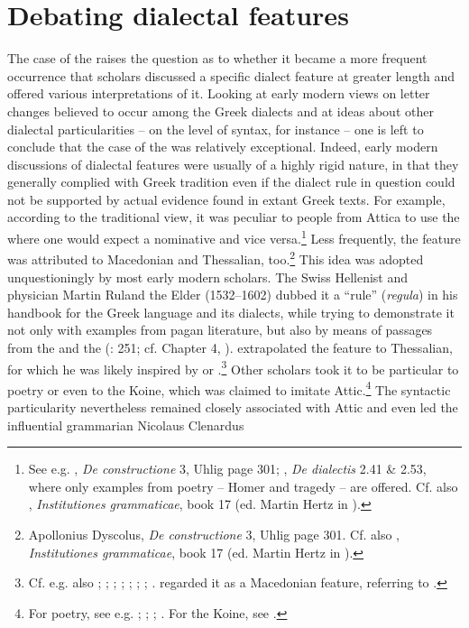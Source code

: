 \section{Debating dialectal features}\label{sec:6.4}

The case of the  raises the question as to whether it became a more frequent occurrence that scholars discussed a specific dialect feature at greater length and offered various interpretations of it. Looking at early modern views on letter changes believed to occur among the Greek dialects and at ideas about other dialectal particularities – on the level of syntax, for instance – one is left to conclude that the case of the  was relatively exceptional. Indeed, early modern discussions of dialectal features were usually of a highly rigid nature, in that they generally complied with Greek tradition even if the dialect rule in question could not be supported by actual evidence found in extant Greek texts. For example, according to the traditional view, it was peculiar to people from Attica to use the  where one would expect a nominative and vice versa.\footnote{See e.g. , \textit{De constructione} 3, Uhlig page 301; , \textit{De dialectis} 2.41 \& 2.53, where only examples from poetry – Homer and tragedy – are offered. Cf. also , \textit{Institutiones grammaticae}, book 17 (ed. Martin Hertz in \citealt[208]{Keil1859}).} Less frequently, the feature was attributed to Macedonian and Thessalian, too.\footnote{Apollonius Dyscolus, \textit{De constructione} 3, Uhlig page 301. Cf. also , \textit{Institutiones grammaticae}, book 17 (ed. Martin Hertz in \citealt[208]{Keil1859}).} This idea was adopted unquestioningly by most early modern scholars. The Swiss Hellenist and physician Martin Ruland the Elder (1532–1602) dubbed it a “rule” (\textit{regula}) in his handbook for the Greek language and its dialects, while trying to demonstrate it not only with examples from pagan literature, but also by means of passages from the  and the  (\citealt{Ruland1556}: 251; cf. Chapter 4, ). \citet[302]{Ruland1556} extrapolated the feature to Thessalian, for which he was likely inspired by  or .\footnote{Cf. e.g. also ; \citet[216]{Vergara1537}; \citet[50\textsc{\textsuperscript{v}}]{Nunez1555}; \citet[\textsc{x.1}\textsc{\textsuperscript{v}}]{Dabercusius1577}; \citet[5, second pagination sequence]{Rhenius1626}; \citet[8--9]{Pasor1632}; \citet[85-87]{Wyss1650}; \citet[88]{Leusden1670}. \citet[\textsc{b.3}\textsc{\textsuperscript{r}}]{Kirchmaier1709} regarded it as a Macedonian feature, referring to .} Other scholars took it to be particular to poetry or even to the Koine, which was claimed to imitate Attic.\footnote{For poetry, see e.g. \citet[\textsc{q.}i\textsc{\textsuperscript{v}}]{Amerot1520}; \citet[129]{Antesignanus1554}; \citet[34]{Gretser1593}; \citet[157]{Schmidt1604}. For the Koine, see \citet[54]{Lancelot1655}.} The syntactic particularity nevertheless remained closely associated with Attic and even led the influential grammarian Nicolaus Clenardus 